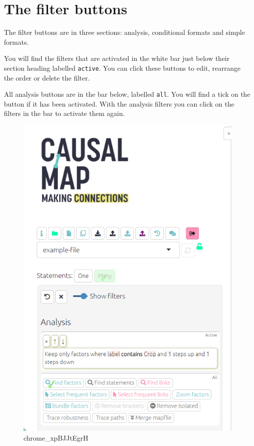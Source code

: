 \documentclass[
]{book}
\begin{document}
\hypertarget{the-filter-buttons}{%
\section{The filter buttons}\label{the-filter-buttons}}

The filter buttons are in three sections: analysis, conditional formats and simple formats.

You will find the filters that are activated in the white bar just below their section heading labelled \texttt{active}. You can click these buttons to edit, rearrange the order or delete the filter.

All analysis buttons are in the bar below, labelled \texttt{all}. You will find a tick on the button if it has been activated. With the analysis filters you can click on the filters in the bar to activate them again.

\begin{figure}
\centering
\includegraphics{_assets/chrome_xpBJJtEgrH.gif}
\caption{chrome\_xpBJJtEgrH}
\end{figure}
\end{document}
